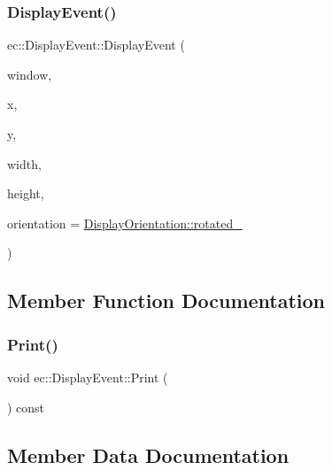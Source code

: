 \subsubsection{\texorpdfstring{Display\+Event()}{DisplayEvent()}\hspace{0.1cm}{\footnotesize\ttfamily [2/2]}}
{\footnotesize\ttfamily ec\+::\+Display\+Event\+::\+Display\+Event (\begin{DoxyParamCaption}\item[{G\+L\+F\+Wwindow $\ast$}]{window,  }\item[{int}]{x,  }\item[{int}]{y,  }\item[{int}]{width,  }\item[{int}]{height,  }\item[{\mbox{\hyperlink{namespaceec_a1492d2e603a780e281848af6a4bad719}{Display\+Orientation}}}]{orientation = {\ttfamily \mbox{\hyperlink{namespaceec_a1492d2e603a780e281848af6a4bad719a138734ec961f603af1c8233366d1ec6d}{Display\+Orientation\+::rotated\+\_}}} }\end{DoxyParamCaption})\hspace{0.3cm}{\ttfamily [explicit]}}



\subsection{Member Function Documentation}
\mbox{\label{structec_1_1_display_event_af677820f4d527a797359eb6d344e97fc}} 
\subsubsection{\texorpdfstring{Print()}{Print()}}
{\footnotesize\ttfamily void ec\+::\+Display\+Event\+::\+Print (\begin{DoxyParamCaption}{ }\end{DoxyParamCaption}) const}



\subsection{Member Data Documentation}
\mbox{\label{structec_1_1_display_event_a395871be035f491d8e894b7cacc609ba}} 
